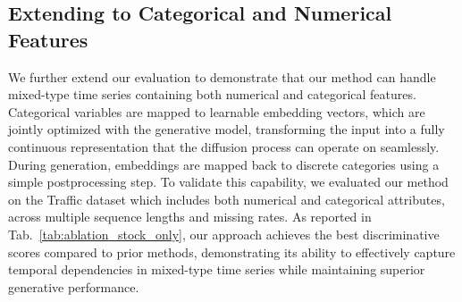 \documentclass{article}
\theoremstyle{plain}
\theoremstyle{definition}
\theoremstyle{remark}
\begin{document}
\label{sec:unatural_exp_cont}


\subsection{Extending to Categorical and Numerical Features}
\label{sec:categorical_numerical_features}

{We further extend our evaluation to demonstrate that our method can handle mixed-type time series containing both numerical and categorical features. Categorical variables are mapped to learnable embedding vectors, which are jointly optimized with the generative model, transforming the input into a fully continuous representation that the diffusion process can operate on seamlessly. During generation, embeddings are mapped back to discrete categories using a simple postprocessing step. To validate this capability, we evaluated our method on the Traffic dataset which includes both numerical and categorical attributes, across multiple sequence lengths and missing rates. As reported in Tab.~\ref{tab:ablation_stock_only}, our approach achieves the best discriminative scores compared to prior methods, demonstrating its ability to effectively capture temporal dependencies in mixed-type time series while maintaining superior generative performance.}

\begin{table}[t]
\renewcommand{\arraystretch}{1}
\centering
\caption{Discriminative scores on mixed-type data (Traffic) with 30\%, 50\%, and 70\% drop-rate for sequence lengths of $24$, and $96$.}
\label{tab:ablation_stock_only}
\end{table}
\end{document}
